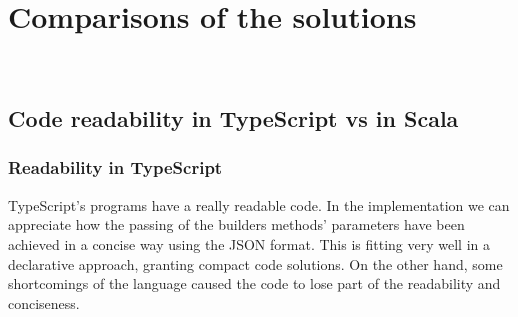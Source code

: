 
\chapter{Comparisons of the solutions}
\label{cap:comparisons}

\\

\section{Code readability in TypeScript vs in Scala}

\subsection{Readability in TypeScript}
TypeScript's programs have a really readable code.
In the implementation we can appreciate how the passing of the builders methods' parameters have been achieved in a concise way using the JSON format.
This is fitting very well in a declarative approach, granting compact code solutions. 
On the other hand, some shortcomings of the language caused the code to lose part of the readability and conciseness.\\
